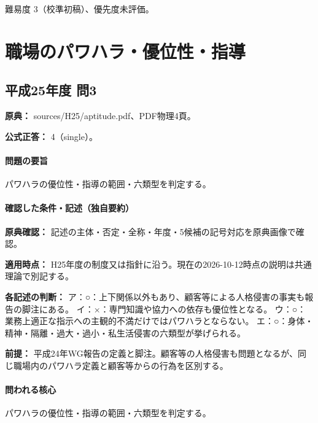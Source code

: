\par 難易度 3（校準初稿）、優先度未評価。

\section{職場のパワハラ・優位性・指導}

\subsection{平成25年度 問3}
\label{q:h25-reg-apt-03}

\noindent\textbf{原典：} sources/H25/aptitude.pdf、PDF物理4頁。

\textbf{公式正答：} 4（single）。

\paragraph{問題の要旨} パワハラの優位性・指導の範囲・六類型を判定する。

\paragraph{確認した条件・記述（独自要約）}\mbox{}\par

\noindent\textbf{原典確認：} 記述の主体・否定・全称・年度・5候補の記号対応を原典画像で確認。\par

\noindent\textbf{適用時点：} H25年度の制度又は指針に沿う。現在の2026-10-12時点の説明は共通理論で別記する。\par

\noindent\textbf{各記述の判断：} ア：○：上下関係以外もあり、顧客等による人格侵害の事実も報告の脚注にある。 イ：×：専門知識や協力への依存も優位性となる。 ウ：○：業務上適正な指示への主観的不満だけではパワハラとならない。 エ：○：身体・精神・隔離・過大・過小・私生活侵害の六類型が挙げられる。\par

\noindent\textbf{前提：} 平成24年WG報告の定義と脚注。顧客等の人格侵害も問題となるが、同じ職場内のパワハラ定義と顧客等からの行為を区別する。\par

\paragraph{問われる核心} パワハラの優位性・指導の範囲・六類型を判定する。

